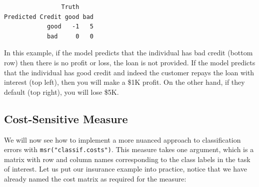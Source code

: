 \begin{Shaded}
\begin{Highlighting}[]
\OtherTok{=} \NormalTok{(}\NormalTok{(}\SpecialCharTok{{-}}\NormalTok{, }\NormalTok{, }\NormalTok{, }\NormalTok{), } \NormalTok{, }
  \NormalTok{(} \OtherTok{=} \NormalTok{(}\NormalTok{, }\NormalTok{),}
     \NormalTok{(}\NormalTok{, }\NormalTok{)))}
\end{Highlighting}
\end{Shaded}

\begin{verbatim}
                Truth
Predicted Credit good bad
            good   -1   5
            bad     0   0
\end{verbatim}

In this example, if the model predicts that the individual has bad
credit (bottom row) then there is no profit or loss, the loan is not
provided. If the model predicts that the individual has good credit and
indeed the customer repays the loan with interest (top left), then you
will make a \$1K profit. On the other hand, if they default (top right),
you will lose \$5K.

\hypertarget{cost-sensitive-measure}{%
\subsection{Cost-Sensitive Measure}\label{cost-sensitive-measure}}

We will now see how to implement a more nuanced approach to
classification errors with \texttt{msr("classif.costs")}. This measure
takes one argument, which is a matrix with row and column names
corresponding to the class labels in the task of interest. Let us put
our insurance example into practice, notice that we have already named
the cost matrix as required for the measure:

\begin{Shaded}
\begin{Highlighting}[]

\OtherTok{=} \NormalTok{(}\NormalTok{)}

\OtherTok{=} \NormalTok{(}\NormalTok{, }
\end{Highlighting}
\end{Shaded}

